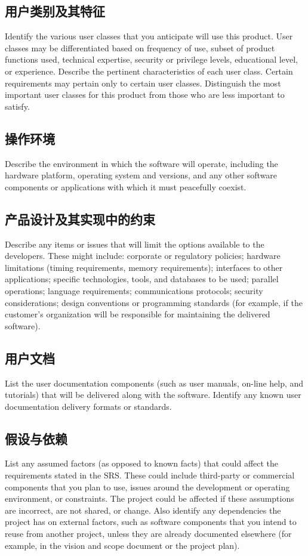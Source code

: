 \documentclass{ctexart}
\begin{document}
\subsection{用户类别及其特征}
Identify the various user classes that you anticipate will use this product.  
User classes may be differentiated based on frequency of use, subset of product 
functions used, technical expertise, security or privilege levels, educational 
level, or experience. Describe the pertinent characteristics of each user class.  
Certain requirements may pertain only to certain user classes. Distinguish the 
most important user classes for this product from those who are less important 
to satisfy.


\subsection{操作环境}
Describe the environment in which the software will operate, including the 
hardware platform, operating system and versions, and any other software 
components or applications with which it must peacefully coexist.


\subsection{产品设计及其实现中的约束}
Describe any items or issues that will limit the options available to the 
developers. These might include: corporate or regulatory policies; hardware 
limitations (timing requirements, memory requirements); interfaces to other 
applications; specific technologies, tools, and databases to be used; parallel 
operations; language requirements; communications protocols; security 
considerations; design conventions or programming standards (for example, if the 
customer's organization will be responsible for maintaining the delivered 
software).


\subsection{用户文档}
List the user documentation components (such as user manuals, on-line help, 
and tutorials) that will be delivered along with the software. Identify any 
known user documentation delivery formats or standards.


\subsection{假设与依赖}
List any assumed factors (as opposed to known facts) that could affect the 
requirements stated in the SRS. These could include third-party or commercial 
components that you plan to use, issues around the development or operating 
environment, or constraints. The project could be affected if these assumptions 
are incorrect, are not shared, or change. Also identify any dependencies the 
project has on external factors, such as software components that you intend to 
reuse from another project, unless they are already documented elsewhere (for 
example, in the vision and scope document or the project plan).
\end{document}
